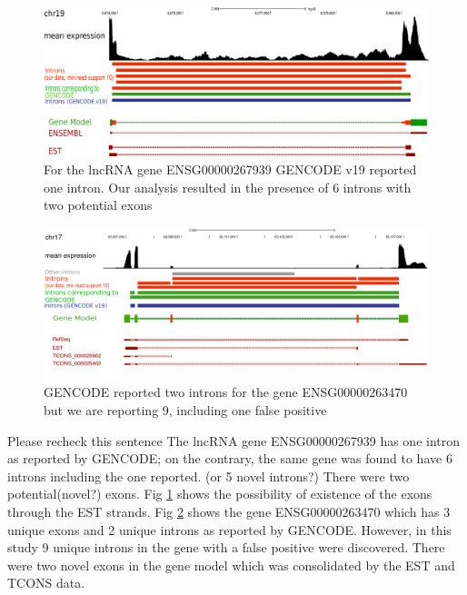 \documentclass[ncrna,article,submit,moreauthors,pdftex,10pt,a4paper]{mdpi}
\newcommand{\TODO}[1]{\begingroup\color{red}#1\endgroup}
\begin{document}
\begin{figure}[H]
\centering
 \includegraphics[width=\linewidth]{267939}
 \caption{For the lncRNA gene ENSG00000267939 GENCODE v19 reported one intron. Our analysis resulted in the presence of 6 introns with two potential exons}
 \label{F03}
\end{figure}
\begin{figure}
 \includegraphics[width=\linewidth]{example.pdf}
 \caption{GENCODE reported two introns for the gene ENSG00000263470 but we are reporting 9, including one false positive}
 \label{F04}
\end{figure}
  

\TODO{Please recheck this sentence} The lncRNA gene ENSG00000267939 has one intron as reported by GENCODE; on the contrary, the same gene was found to have 
6 introns including the one reported. (or 5 novel introns?) There were two potential(novel?) exons. Fig \ref{F03} shows the possibility of 
existence of the exons through the EST strands. Fig \ref{F04} shows the gene ENSG00000263470 which has 3 unique exons and 2 unique introns 
as reported by GENCODE. 
However, in this study 9 unique introns in the gene with a false positive were discovered. There were two novel exons in the gene model 
which was consolidated by the EST and TCONS data.



\vspace{6pt} 

\end{document}
